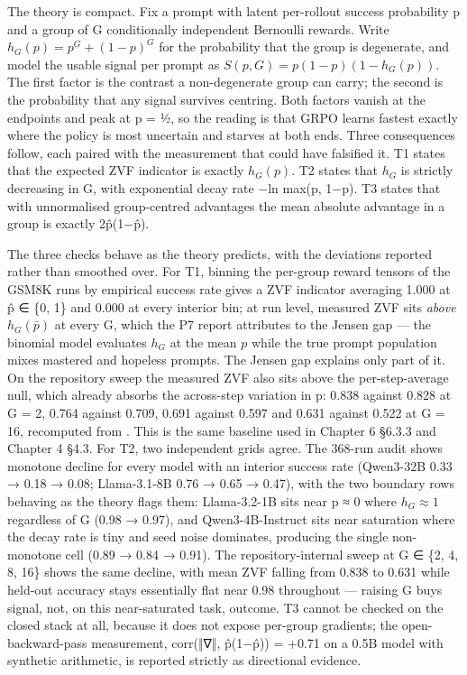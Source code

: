 \documentclass[12pt,a4paper]{report}
\newcommand{\longtok}[1]{\texttt{\seqsplit{#1}}}
\begin{document}
The theory is compact. Fix a prompt with latent per-rollout success
probability p and a group of G conditionally independent Bernoulli
rewards. Write \(h_G(p) = p^G + (1-p)^G\) for the probability that the
group is degenerate, and model the usable signal per prompt as
\(S(p,G) = p(1-p)(1-h_G(p))\). The first factor is the contrast a
non-degenerate group can carry; the second is the probability that any
signal survives centring. Both factors vanish at the endpoints and peak
at p = ½, so the reading is that GRPO learns fastest exactly where the
policy is most uncertain and starves at both ends. Three consequences
follow, each paired with the measurement that could have falsified it.
T1 states that the expected ZVF indicator is exactly \(h_G(p)\). T2
states that \(h_G\) is strictly decreasing in G, with exponential decay
rate −ln max(p, 1−p). T3 states that with unnormalised group-centred
advantages the mean absolute advantage in a group is exactly 2p̂(1−p̂).

The three checks behave as the theory predicts, with the deviations
reported rather than smoothed over. For T1, binning the per-group reward
tensors of the GSM8K runs by empirical success rate gives a ZVF
indicator averaging 1.000 at p̂ ∈ \{0, 1\} and 0.000 at every interior
bin; at run level, measured ZVF sits \emph{above} \(h_G(\bar p)\) at
every G, which the P7 report attributes to the Jensen gap --- the
binomial model evaluates \(h_G\) at the mean \(p\) while the true prompt
population mixes mastered and hopeless prompts. The Jensen gap explains
only part of it. On the repository sweep the measured ZVF also sits
above the per-step-average null, which already absorbs the across-step
variation in p: 0.838 against 0.828 at G = 2, 0.764 against 0.709, 0.691
against 0.597 and 0.631 against 0.522 at G = 16, recomputed from
\longtok{groupsize\_\allowbreak{}zvf\_\allowbreak{}sweep.json}. This is the same baseline used in
Chapter 6 §6.3.3 and Chapter 4 §4.3. For T2, two independent grids
agree. The 368-run audit shows monotone decline for every model with an
interior success rate (Qwen3-32B 0.33 → 0.18 → 0.08; Llama-3.1-8B 0.76 →
0.65 → 0.47), with the two boundary rows behaving as the theory flags
them: Llama-3.2-1B sits near p ≈ 0 where \(h_G \approx 1\) regardless of
G (0.98 → 0.97), and Qwen3-4B-Instruct sits near saturation where the
decay rate is tiny and seed noise dominates, producing the single
non-monotone cell (0.89 → 0.84 → 0.91). The repository-internal sweep at
G ∈ \{2, 4, 8, 16\} shows the same decline, with mean ZVF falling from
0.838 to 0.631 while held-out accuracy stays essentially flat near 0.98
throughout --- raising G buys signal, not, on this near-saturated task,
outcome. T3 cannot be checked on the closed stack at all, because it
does not expose per-group gradients; the open-backward-pass measurement,
corr(‖∇‖, p̂(1−p̂)) = +0.71 on a 0.5B model with synthetic arithmetic, is
reported strictly as directional evidence.
\end{document}
